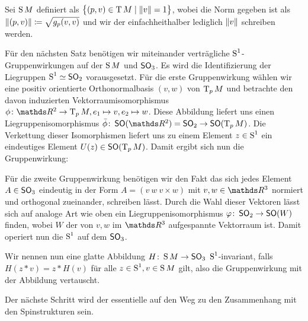 Sei $\S M$ definiert als $\set{(p,v) \in \TT M}{ \norm{v} = 1}$, wobei
die Norm gegeben ist als $ \norm{(p,v)} \coloneqq \sqrt{g_p(v,v)} $
und wir der einfachheithalber lediglich $ \norm{v} $ schreiben werden.

Für den nächsten Satz benötigen wir miteinander verträgliche $ \S^1 $-Gruppenwirkungen auf der $ \S M $ und $ \so_3 $. Es wird die Identifizierung der Liegruppen $ \S^1 \simeq \so_2 $ vorausgesetzt. Für die erste
Gruppenwirkung wählen wir eine positiv orientierte Orthonormalbasis
$ (v,w) $ von $ \tang{p}{M} $ und betrachte den davon induzierten
Vektorraumisomorphismus $ \abb{\phi}{\R^2}{\tang{p}{M}},e_1 \mapsto v, e_2\mapsto w $. Diese
Abbildung liefert uns einen Liegruppenisomorphismus $\abb{\bar{\phi}}{\so(\R^2) = \so_2}{\so(\tang{p}{M})} $. Die Verkettung
dieser Isomorphismen liefert uns zu einem Element $ z\in\S^1 $ ein
eindeutiges Element $ U(z)\in \so(\tang{p}{M}) $. Damit ergibt sich
nun die Gruppenwirkung:

Für die zweite Gruppenwirkung benötigen wir den Fakt das sich jedes
Element $ A \in \so_3$  eindeutig in der Form $ A=\left( v~w~v\times w\right) $ mit $ v,w \in \R^3$ normiert und orthogonal zueinander, 
schreiben lässt. Durch die Wahl dieser Vektoren lässt sich auf
analoge Art wie oben ein Liegruppenisomorphismus $ \abb{\varphi}{\so_2}{\so(W)} $ finden, wobei $ W $ der von $ v,w $ 
im $ \R^3 $ aufgespannte Vektorraum ist. Damit operiert nun die
$ \S^1 $ auf dem $ \so_3 $.

Wir nennen nun eine glatte Abbildung $ \abb{H}{\S M}{\so_3}~\S^1$-invariant, falls $ H(z*v) = z*H(v) $ für alle $ z \in \S^1, v\in \S M $ gilt, also die Gruppenwirkung mit der Abbildung vertauscht. 
 

Der nächste Schritt wird der essentielle auf den Weg zu den
Zusammenhang mit den Spinstrukturen sein.

